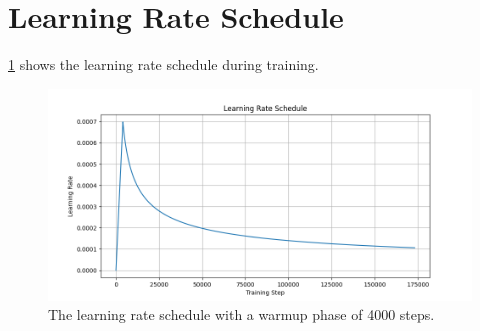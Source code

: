 \section{Learning Rate Schedule}
\cref{fig:lr} shows the learning rate schedule during training.

\begin{figure}[h]
    \begin{center}
        \includegraphics[width=\textwidth]{figures/lr_schedule_20250129_142747.png}
    \end{center}
    \caption{The learning rate schedule with a warmup phase of 4000 steps.}
    \label{fig:lr}
\end{figure}


